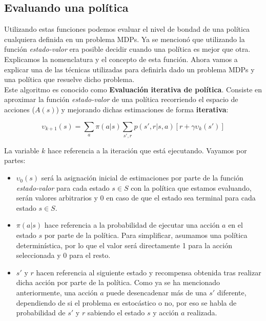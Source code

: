 \documentclass[11pt,fleqn]{book} %
\begin{document}

\subsection{Evaluando una política}\label{sec:evaluacion}

Utilizando estas funciones podemos evaluar el nivel de bondad de una política cualquiera definida en un problema MDPs. Ya se mencionó que utilizando la función \textit{estado-valor} era posible decidir cuando una política es mejor que otra. \\

Explicamos la nomenclatura y el concepto de esta función. Ahora vamos a explicar una de las técnicas utilizadas para definirla dado un problema MDPs y una política que resuelve dicho problema. \\

Este algoritmo es conocido como \textbf{Evaluación iterativa de política}. Consiste en aproximar la función \textit{estado-valor} de una política recorriendo el espacio de acciones ($A(s)$) y mejorando dichas estimaciones de forma \textbf{iterativa}:


\begin{equation}\label{eqn:1}
\upsilon_{k+1}(s)=\sum_a\pi(a|s) \sum_{s',r}p(s',r|s,a)\left[r+\gamma\upsilon_k(s')\right]
\end{equation}

La variable $k$ hace referencia a la iteración que está ejecutando. Vayamos por partes: \\

\begin{itemize}
	\item $\upsilon_0(s)$ será la asignación inicial de estimaciones por parte de la función \textit{estado-valor} para cada estado $s \in S$ con la política que estamos evaluando, serán valores arbitrarios y 0 en caso de que el estado sea terminal para cada estado $s \in S$. \\
	
	\item $\pi(a|s)$ hace referencia a la probabilidad de ejecutar una acción $a$ en el estado $s$ por parte de la política. Para simplificar, asumamos una política determinística, por lo que el valor será directamente 1 para la acción seleccionada y 0 para el resto. \\
	
	\item $s'$ y $r$ hacen referencia al siguiente estado y recompensa obtenida tras realizar dicha acción por parte de la política. Como ya se ha mencionado anteriormente, una acción $a$ puede desencadenar más de una $s'$ diferente, dependiendo de si el problema es estocástico o no, por eso se habla de probabilidad de $s'$ y $r$ sabiendo el estado $s$ y acción $a$ realizada. \\
\end{itemize}
\end{document}
